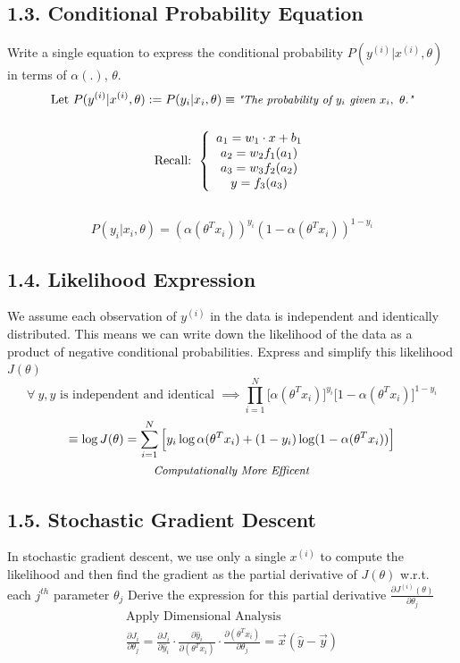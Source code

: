 \documentclass[11pt]{article}
\theoremstyle{plain}
\begin{document}
\subsection*{1.3. Conditional Probability Equation }
Write a single equation to express the conditional probability $P(y^{(i)}|x^{(i)},\theta)$ in terms of $\alpha(.)$, $\theta$.
\[
	\begin{gathered}
		\text{Let } P(y^{(i)}|x^{(i)},\theta) := P(y_{i}|x_{i},\theta) \equiv \small{\textit{\text{"The probability of $y_i$ given $x_i, ~\theta$."}}} \\\\
		\text{Recall: }
		\left \{
		\begin{array}{cc}
			a_1 = w_1 \cdot x + b_1 \\
			a_2 = w_2 f_1(a_1)      \\
			a_3 = w_3 f_2(a_2)      \\
			y = f_3(a_3)
		\end{array}
		\right . \\\\
	\end{gathered}
\]
\[ P(y_i | x_i, \theta) = (\alpha(\theta^T x_i))^{y_i} (1 - \alpha(\theta^T x_i))^{1 - y_i} \]

\subsection*{1.4. Likelihood Expression }
We assume each observation of $y^{(i)}$ in the data is independent and identically distributed.  This means we can write down the likelihood of the data as a product of negative conditional probabilities.  Express and simplify this likelihood $J(\theta)$
\[
	\forall~ y, y \text{ is independent and identical } \implies \prod_{i=1}^{N} \big[\alpha(\theta^T x_i)\big]^{y_i} \big[1-\alpha(\theta^T x_i)\big]^{1-y_i}
\]
\[
	\begin{gathered}
		\equiv \log J(\theta) = \sum_{i=1}^{N} \Big[ y_i \log \alpha(\theta^T x_i) + (1-y_i) \log (1 - \alpha(\theta^T x_i)) \Big]\\
		\small{\text{\textit{Computationally More Efficent}}} \\
	\end{gathered}
\]

\subsection*{1.5. Stochastic Gradient Descent }
In stochastic gradient descent, we use only a single $x^{(i)}$ to compute the likelihood and then find the gradient as the partial derivative of $J(\theta)$ w.r.t.  each $j^{th}$ parameter $\theta_{j}$ Derive the expression for this partial derivative $\frac{\partial J^{(i)}(\theta)}{\partial\theta_{j}}$
\[
	\begin{gathered}
		\text{Apply Dimensional Analysis} \\
		\frac {\partial J_i} {\partial\theta_{j}} =
		\frac {\partial J_i} {\partial \hat{y}_i} \cdot \frac
		{\partial \hat{y}_i} {\partial (\theta^Tx_i)} \cdot
		\frac {\partial (\theta^Tx_i)} {\partial \theta_j} = \vec{x}(\hat{y}-\vec{y})
	\end{gathered}
\]
\end{document}
